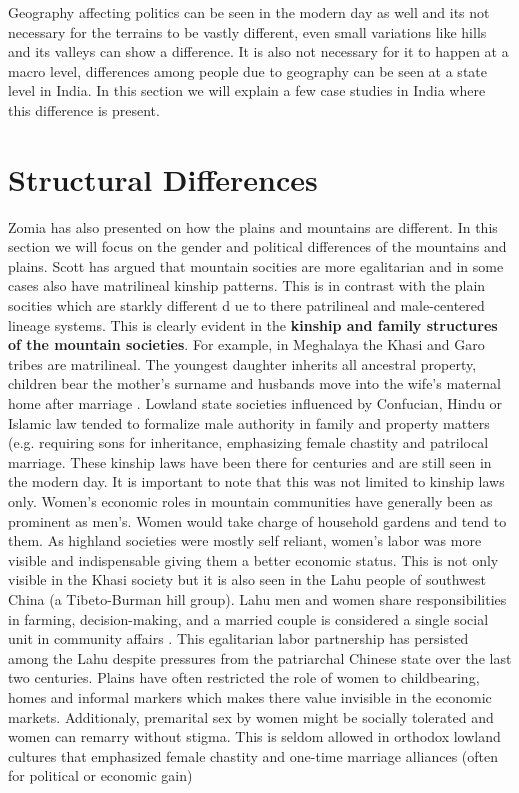 \vspace{0.3cm}

Geography affecting politics can be seen in the modern day as well and its not necessary for the terrains to be vastly different, even small variations like hills and its valleys can show a difference. It is also not necessary for it to happen at a macro level, differences among people due to geography can be seen at a state level in India. In this section we will explain a few case studies in India where this difference is present. 

\section{Structural Differences}

Zomia has also presented on how the plains and mountains are different. In this section we will focus on the gender and political differences of the mountains and plains. Scott has argued that mountain socities are more egalitarian and in some cases also have matrilineal kinship patterns. This is in contrast with the plain socities which are starkly different d ue to there patrilineal and male-centered lineage systems. This is clearly evident in the \textbf{kinship and family structures of the mountain societies}. For example, in Meghalaya the Khasi and Garo tribes are matrilineal. The youngest daughter inherits all ancestral property, children bear the mother’s surname and husbands move into the wife’s maternal home after marriage \citep{Allen_2012}. Lowland state societies influenced by Confucian, Hindu or Islamic law tended to formalize male authority in family and property matters (e.g. requiring sons for inheritance, emphasizing female chastity and patrilocal marriage. These kinship laws have been there for centuries and are still seen in the modern day. It is important to note that this was not limited to kinship laws only. Women’s economic roles in mountain communities have generally been as prominent as men’s. Women would take charge of household gardens and tend to them. As highland societies were mostly self reliant, women's labor was more visible and indispensable giving them a better economic status. This is not only visible in the Khasi society but it is also seen in the Lahu people of southwest China (a Tibeto-Burman hill group). Lahu men and women share responsibilities in farming, decision-making,  and a married couple is considered a single social unit in community affairs \citep{Du_2015}. This egalitarian labor partnership has persisted among the Lahu despite pressures from the patriarchal Chinese state over the last two centuries. Plains have often restricted the role of women to childbearing, homes and informal markers which makes there value invisible in the economic markets. Additionaly, premarital sex by women might be socially tolerated and women can remarry without stigma. This is seldom allowed in orthodox lowland cultures that emphasized female chastity and one-time marriage alliances (often for political or economic gain)
